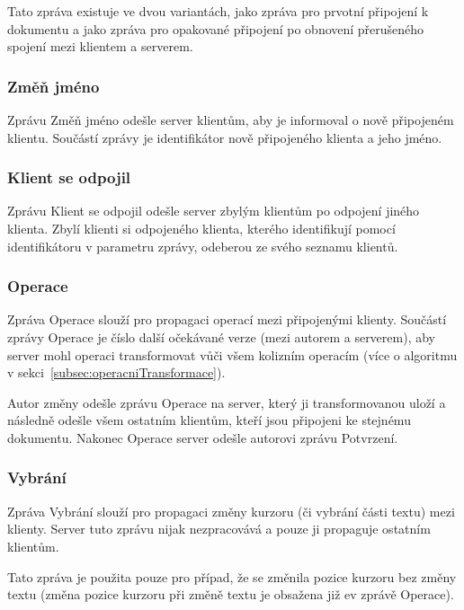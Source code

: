 Tato zpráva existuje ve dvou variantách, jako zpráva pro prvotní připojení k dokumentu a jako zpráva pro opakované připojení po obnovení přerušeného spojení mezi klientem a serverem.

\subsubsection{Změň jméno} %

Zprávu Změň jméno odešle server klientům, aby je informoval o nově připojeném klientu.
Součástí zprávy je identifikátor nově připojeného klienta a jeho jméno.

\subsubsection{Klient se odpojil} %

Zprávu Klient se odpojil odešle server zbylým klientům po odpojení jiného klienta.
Zbylí klienti si odpojeného klienta, kterého identifikují pomocí identifikátoru v parametru zprávy, odeberou ze svého seznamu klientů.

\subsubsection{Operace} %

Zpráva Operace slouží pro propagaci operací mezi připojenými klienty.
Součástí zprávy Operace je číslo další očekávané verze (mezi autorem a serverem), aby server mohl operaci transformovat vůči všem kolizním operacím (více o algoritmu v sekci~\ref{subsec:operacniTransformace}).

Autor změny odešle zprávu Operace na server, který ji transformovanou uloží a následně odešle všem ostatním klientům, kteří jsou připojeni ke stejnému dokumentu.
Nakonec Operace server odešle autorovi zprávu Potvrzení.

\subsubsection{Vybrání} %

Zpráva Vybrání slouží pro propagaci změny kurzoru (či vybrání části textu) mezi klienty.
Server tuto zprávu nijak nezpracovává a pouze ji propaguje ostatním klientům.

Tato zpráva je použita pouze pro případ, že se změnila pozice kurzoru bez změny textu (změna pozice kurzoru při změně textu je obsažena již ev zprávě Operace).

